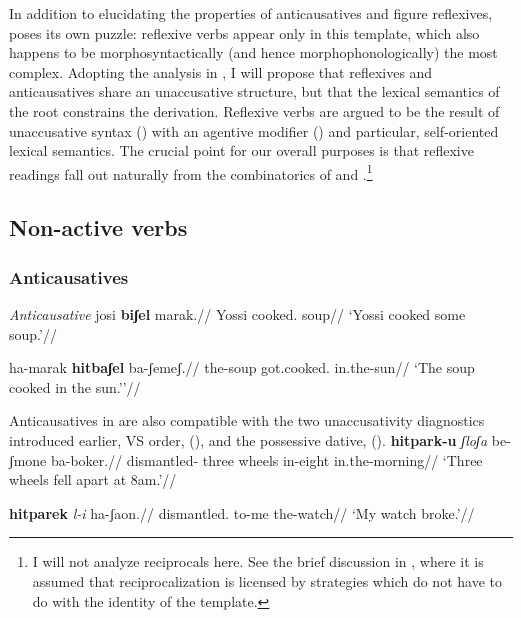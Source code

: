 In addition to elucidating the properties of anticausatives and figure reflexives, {\thit} poses its own puzzle: reflexive verbs appear only in this template, which also happens to be morphosyntactically (and hence morphophonologically) the most complex. Adopting the analysis in \cite{kastner17gjgl}, I will propose that reflexives and anticausatives share an unaccusative structure, but that the lexical semantics of the root constrains the derivation. Reflexive verbs are argued to be the result of unaccusative syntax (\vz) with an agentive modifier (\va) and particular, self-oriented lexical semantics. The crucial point for our overall purposes is that reflexive readings fall out naturally from the combinatorics of {\vz} and {\va}.\footnote{I will not analyze reciprocals here. See the brief discussion in \citet[20]{kastner17gjgl}, where it is assumed that reciprocalization is licensed by strategies which do not have to do with the identity of the template.}


	\subsection{Non-active verbs} \label{vz:thit:nact}
		\subsubsection{Anticausatives}
\pex\label{ex:vz:anticaus-va2}\textit{Anticausative}
	\a \begingl
		\gla josi \textbf{biʃel} marak.//
		\glb Yossi cooked. soup//
		\glft `Yossi cooked some soup.'//
	\endgl
	
	\a \begingl
		\gla ha-marak \textbf{hitbaʃel} ba-ʃemeʃ.//
		\glb the-soup got.cooked. in.the-sun//
		\glft `The soup cooked in the sun.''//
	\endgl
\xe





Anticausatives in {\thit} are also compatible with the two unaccusativity diagnostics introduced earlier,  VS order, (\nextx), and the possessive dative, (\anextx).
\ex\label{ex:vs-anticaus} \begingl
	\gla{}\textbf{hitpark-u} \emph{ʃloʃa}  be-ʃmone ba-boker.//
	\glb dismantled- three wheels in-eight in.the-morning//
	\glft `Three wheels fell apart at 8am.'//
	\endgl
\xe

\ex
\begingl
\gla{}\textbf{hitparek} \emph{l-i} ha-ʃaon.//
\glb dismantled. to-me the-watch//
\glft `My watch broke.'//
\endgl
\xe



